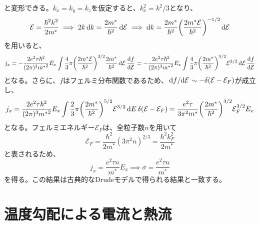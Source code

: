\documentclass[a4paper,5pt,uplatex]{jsarticle}
\theoremstyle{mystyle} %
\begin{document}
と変形できる。$k_x=k_y=k_z$を仮定すると、$k_x^2 = k^2/3$となり、
\begin{equation}
	\mathcal{E} = \frac{\hbar^2k^2}{2m^*} \implies 2k\dd{k} = \frac{2m^*}{\hbar^2}\dd{\mathcal{E}} \implies \dd{k} = \frac{2m^*}{\hbar^2}\qty(\frac{2m^*\mathcal{E}}{\hbar^2})^{-1/2}\dd{\mathcal{E}}
\end{equation}
を用いると、
\begin{equation}
	j_x = -\frac{2e^2\tau\hbar^2}{(2\pi)^3{m^*}^2}E_x\int\frac{4}{3}\pi{}\qty(\frac{2m^*\mathcal{E}}{\hbar^2})^{3/2}\frac{2m^*}{\hbar^2}\dd{\mathcal{E}}\dv{f}{\mathcal{E}}
	= -\frac{2e^2\tau\hbar^2}{(2\pi)^3{m^*}^2}E_x\int\frac{4}{3}\pi{}\qty(\frac{2m^*}{\hbar^2})^{5/2}\mathcal{E}^{3/2}\dd{\mathcal{E}}\dv{f}{\mathcal{E}}
\end{equation}
となる。さらに、$f$はフェルミ分布関数であるため、$\dv*{f}{\mathcal{E}} \sim -\delta(\mathcal{E}-\mathcal{E}_{F})$が成立し、
\begin{equation}
	j_x = \frac{2e^2\tau\hbar^2}{(2\pi)^3{m^*}^2}E_x\int\frac{2}{3}\pi{}\qty(\frac{2m^*}{\hbar^2})^{5/2}\mathcal{E}^{3/2}\dd{E}\delta(\mathcal{E}-\mathcal{E}_F)
	= \frac{e^2\tau}{3\pi^2{m^*}}\qty(\frac{2m^*}{\hbar^2})^{3/2}\mathcal{E}_F^{3/2}E_x
\end{equation}
となる。フェルミエネルギー$\mathcal{E}_F$は、全粒子数$n$を用いて
\begin{equation}
	\mathcal{E}_F = \frac{\hbar^2}{2m^*}(3\pi^2n)^{2/3} = \frac{\hbar^2k_{F}^2}{2m^*}
\end{equation}
と表されるため、
\begin{equation}
	j_x = \frac{e^2\tau{}n}{m^*}E_x \implies \sigma = \frac{e^2\tau{}n}{m^*}
\end{equation}
を得る。この結果は古典的なDrudeモデルで得られる結果と一致する。




\section{温度勾配による電流と熱流}
\end{document}

